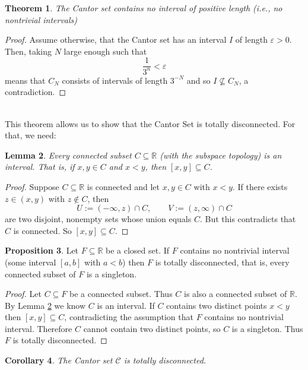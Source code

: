 \documentclass{article}
\theoremstyle{plain}
\newtheorem{thm}{Theorem}[section]
\newtheorem{lem}[thm]{Lemma}
\newtheorem{cor}[thm]{Corollary}
\theoremstyle{definition}
\newtheorem{prop}[thm]{Proposition}
\theoremstyle{remark}
\begin{document}
\begin{thm}\label{thm:cantor_interval}
    The Cantor set contains no interval of positive length (i.e., no nontrivial intervals)
\end{thm}
\begin{proof}
    Assume otherwise, that the Cantor set has an interval $I$ of length $\varepsilon > 0$. Then, taking $N$ large enough such that \[
    \frac{1}{3^n} < \varepsilon
    \] means that $C_N$ consists of intervals of length $3^{-N}$ and so $I \not \subseteq C_N$, a contradiction.
\end{proof}
~\\This theorem allows us to show that the Cantor Set is totally disconnected. For that, we need:

\begin{lem}
\label{lem:connected-subsets-are-intervals}
Every connected subset \(C\subseteq\mathbb{R}\) (with the subspace topology) is an interval. That is, if \(x,y\in C\) and \(x<y\), then \([x,y]\subseteq C\).
\end{lem}

\begin{proof}
Suppose \(C\subseteq\mathbb R\) is connected and let \(x,y\in C\) with \(x<y\). If there exists \(z\in (x,y)\) with \(z\notin C\), then
\[
U:=(-\infty,z)\cap C,\qquad V:= (z,\infty)\cap C
\]
are two disjoint, nonempty sets whose union equals \(C\). But this contradicts that $C$ is connected. So $[x,y] \subseteq C$.
\end{proof}

\begin{prop}
\label{prop:closed-no-intervals-totally-disconnected}
Let \(F\subseteq\mathbb{R}\) be a closed set. If \(F\) contains no nontrivial interval (some interval $[a,b]$ with $a < b$) then \(F\) is totally disconnected, that is, every connected subset of \(F\) is a singleton.
\end{prop}

\begin{proof}
Let \(C\subseteq F\) be a connected subset. Thus \(C\) is also a connected subset of \(\mathbb R\). By Lemma \ref{lem:connected-subsets-are-intervals} we know \(C\) is an interval. If \(C\) contains two distinct points \(x<y\) then $[x,y]\subseteq C$, contradicting the assumption that \(F\) contains no nontrivial interval. Therefore \(C\) cannot contain two distinct points, so \(C\) is a singleton. Thus \(F\) is totally disconnected.
\end{proof}

\begin{cor}
The  Cantor set \(\mathcal{C}\) is totally disconnected.
\end{cor}
\end{document}
